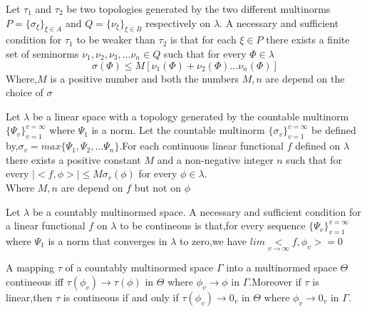 \begin{large}
\begin{lemma}
Let $\tau_{1}$ and $\tau_{2}$ be two topologies generated by the two different multinorms $ P =\lbrace\sigma_{\xi}\rbrace_{\xi \in A} $ and $ Q =\lbrace\nu_{\xi}\rbrace_{\xi \in B} $ respectively on $ \lambda $. A necessary and sufficient condition for $ \tau_{1}  $ to be weaker than $ \tau_{2}  $ is that for each $ \xi \in P $ there exists a finite set of seminorms $ \nu_{1},\nu_{2},\nu_{3},...\nu_{n} \in Q $ such that for every $\Phi \in \lambda $
\begin{equation*}
\sigma(\Phi) \leq M [\nu_{1}(\Phi)+\nu_{2}(\Phi)...\nu_{n}(\Phi)]
\end{equation*}
Where,$ M $ is a positive number and both the numbers $ M,n $ are depend on the choice of $ \sigma $
\end{lemma}

\begin{lemma}

Let $ \lambda $ be a linear space with a topology generated by the countable multinorm $\lbrace \Psi_{v}\rbrace_{v=1}^{v=\infty}$ where $ \Psi_{1} $ is a norm. Let the countable multinorm $\lbrace \sigma_{v}\rbrace_{v=1}^{v=\infty}$ be defined by,$ \sigma_{v} = max\lbrace \Psi_{1},\Psi_{2},...\Psi_{n} \rbrace $.For each continuous linear functional $ f $ defined on $ \lambda $ there exists a positive constant $ M $ and a non-negative integer $ n $ such that for every                  $ \vert <f,\phi >   \vert\leq M \sigma_{r}(\phi)$ \hspace{0.5cm} for every $ \phi \in \lambda $.\\
Where $ M,n $ are depend on $f$ but not on $ \phi $
\end{lemma}

\begin{lemma}
Let $ \lambda $ be a countably multinormed space. A necessary and sufficient condition for a linear functional $ f $ on  $ \lambda $ to be contineous is that,for every sequence $\lbrace \Psi_{v}\rbrace_{v=1}^{v=\infty}$ where $ \Psi_{1} $ is a norm that converges in $ \lambda $ to zero,we have $ lim \underset{v\rightarrow \infty} <f,\phi_{v} > =0 $
\end{lemma}

\begin{lemma}
A mapping $ \tau $ of a countably multinormed space $ \Gamma $ into a multinormed space $\Theta$ contineous iff $ \tau(\phi_{v})\rightarrow \tau(\phi) $ in $\Theta$ where $ \phi_{v}\rightarrow \phi $ in $ \Gamma $.Moreover if $ \tau $ is linear,then $ \tau $ is contineous if and only if $ \tau(\phi_{v})\rightarrow 0_{v} $ in $\Theta $ where $ \phi_{v}\rightarrow 0_{v} $ in $ \Gamma $.


\end{lemma}
\end{large}
